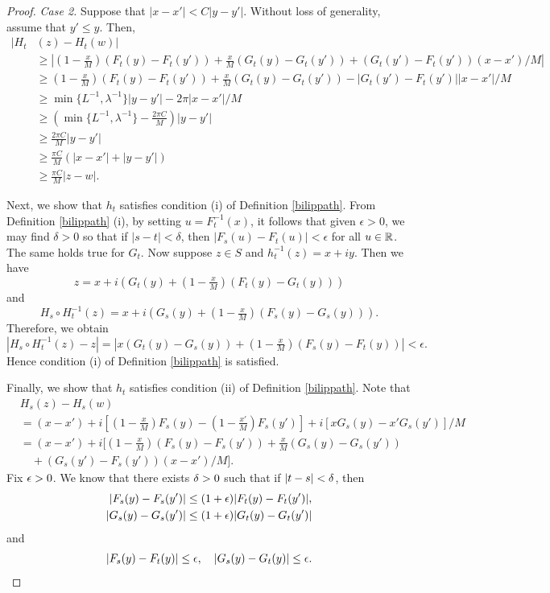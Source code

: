 \documentclass{amsart}
\begin{document}
\begin{proof}
\emph{Case 2.} Suppose that $|x-x'| < C |y-y'|$. Without loss of generality, assume that $y' \leq y$. Then, 
\begin{align*}
|H_t&(z) - H_t(w)|\\
&\geq |(1-\tfrac{x}{M})(F_t(y)-F_t(y')) + \tfrac{x}{M}(G_t(y)-G_t(y')) + (G_t(y')-F_t(y'))(x-x')/M|\\
&\geq (1-\tfrac{x}{M})(F_t(y)-F_t(y')) + \tfrac{x}{M}(G_t(y)-G_t(y')) - |G_t(y')-F_t(y')||x-x'|/M\\
&\geq \min\{L^{-1},\lambda^{-1}\}|y-y'| - 2\pi |x-x'|/M \\
&\geq \left ( \min\{L^{-1},\lambda^{-1}\} - \frac{2\pi C}{M} \right ) |y-y'|\\
&\geq \frac{2\pi C}{M} |y-y'|\\
&\geq \frac{\pi C}{M} ( |x-x'| + |y-y'| )\\
&\geq \frac{\pi C}{M}|z-w|.
\end{align*}

Next, we show that $h_t$ satisfies condition (i) of Definition \ref{bilippath}. From Definition \ref{bilippath} (i), by setting $u=F_t^{-1}(x)$, it follows that given $\epsilon >0$, we may find $\delta> 0$ so that if $|s-t|<\delta$, then $|F_s(u) - F_t(u) | <\epsilon$ for all $u\in \mathbb{R}$. The same holds true for $G_t$. Now suppose $z\in S$ and $h_t^{-1}(z) = x+iy$. Then we have
\[ z = x + i\left ( G_t(y) + (1-\tfrac{x}{M}) (F_t(y ) - G_t(y) ) \right ) \]
and 
\[ H_s \circ H_t^{-1}(z) =x +  i\left ( G_s(y) + (1-\tfrac{x}{M}) (F_s(y ) - G_s(y) ) \right ).\]
Therefore, we obtain
\[ |H_s\circ H_t^{-1}(z) - z | = \left |x (G_t(y) - G_s(y)) + (1- \tfrac{x}{M}) (F_s(y) - F_t(y) ) \right | < \epsilon. \]
Hence condition (i) of Definition \ref{bilippath} is satisfied.

Finally, we show that $h_t$ satisfies condition (ii) of Definition \ref{bilippath}. Note that
\begin{align*} 
&H_s(z) - H_s(w)\\ 
&= (x-x') + i \left[ (1-\tfrac{x}{M})F_s(y) - (1-\tfrac{x'}{M})F_s(y') \right] + i \left[ xG_s(y) - x'G_s(y') \right]/M\\
&= (x-x') + i [ (1-\tfrac{x}{M})(F_s(y)-F_s(y')) + \tfrac{x}{M}(G_s(y)-G_s(y'))\\ 
&\quad+ (G_s(y')-F_s(y'))(x-x')/M].
\end{align*}
Fix $\epsilon>0$. We know that there exists $\delta>0$ such that if $|t-s| <\delta$, then
\begin{align*}
|F_s(y)-F_s(y')| &\leq (1+\epsilon)|F_t(y)-F_t(y')|,\\ 
|G_s(y)-G_s(y')| &\leq (1+\epsilon)|G_t(y)-G_t(y')|
\end{align*}
and
\begin{align*}
|F_s(y)-F_t(y)| \leq \epsilon, \quad |G_s(y)-G_t(y)| \leq \epsilon.
\end{align*}


\end{proof}
\end{document}
